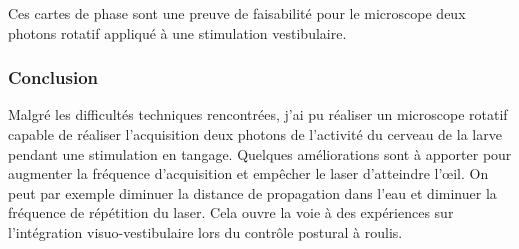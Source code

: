 Ces cartes de phase sont une preuve de faisabilité pour le microscope deux photons rotatif appliqué à une stimulation vestibulaire.

\subsubsection{Conclusion}

Malgré les difficultés techniques rencontrées, j'ai pu réaliser un microscope rotatif capable de réaliser l'acquisition deux photons de l'activité du cerveau de la larve pendant une stimulation en tangage. Quelques améliorations sont à apporter pour augmenter la fréquence d'acquisition et empêcher le laser d'atteindre l'œil. On peut par exemple diminuer la distance de propagation dans l'eau et diminuer la fréquence de répétition du laser. Cela ouvre la voie à des expériences sur l'intégration visuo-vestibulaire lors du contrôle postural à roulis.